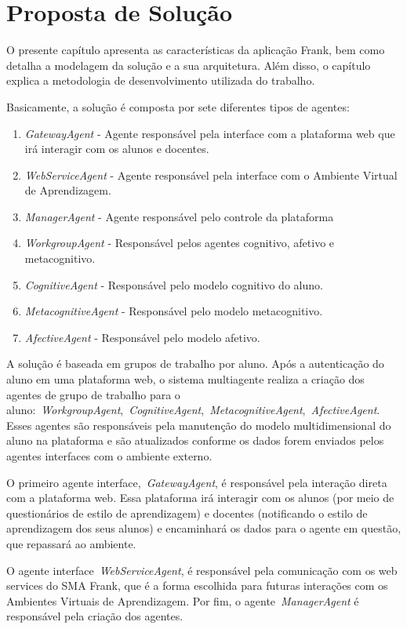 \chapter{Proposta de Solução}

O presente capítulo apresenta as características da aplicação Frank, bem como detalha a modelagem da solução e a sua arquitetura. Além disso, o capítulo explica a metodologia de desenvolvimento utilizada do trabalho.

Basicamente, a solução é composta por sete diferentes tipos de agentes:
\begin{enumerate}
	\item \emph{GatewayAgent} - Agente responsável pela interface com a plataforma web que irá interagir com os alunos e docentes.
	\item \emph{WebServiceAgent} - Agente responsável pela interface com o Ambiente Virtual de Aprendizagem.
	\item \emph{ManagerAgent} - Agente responsável pelo controle da plataforma
	\item \emph{WorkgroupAgent} - Responsável pelos agentes cognitivo, afetivo e metacognitivo.
	\item \emph{CognitiveAgent} - Responsável pelo modelo cognitivo do aluno.
	\item \emph{MetacognitiveAgent} - Responsável pelo modelo metacognitivo.
	\item \emph{AfectiveAgent} - Responsável pelo modelo afetivo.
\end{enumerate}

A solução é baseada em grupos de trabalho por aluno. Após a autenticação do aluno em uma plataforma web, o sistema multiagente realiza a criação dos agentes de grupo de trabalho para o aluno:~\emph{WorkgroupAgent},~\emph{CognitiveAgent},~\emph{MetacognitiveAgent},~\emph{AfectiveAgent}. Esses agentes são responsáveis pela manutenção do modelo multidimensional do aluno na plataforma e são atualizados conforme os dados forem enviados pelos agentes interfaces com o ambiente externo.

O primeiro agente interface,~\emph{GatewayAgent}, é responsável pela interação direta com a plataforma web. Essa plataforma irá interagir com os alunos (por meio de questionários de estilo de aprendizagem) e docentes (notificando o estilo de aprendizagem dos seus alunos) e encaminhará os dados para o agente em questão, que repassará ao ambiente.

O agente interface~\emph{WebServiceAgent}, é responsável pela comunicação com os web services do SMA Frank, que é a forma escolhida para futuras interações com os Ambientes Virtuais de Aprendizagem. Por fim, o agente~\emph{ManagerAgent} é responsável pela criação dos agentes.

